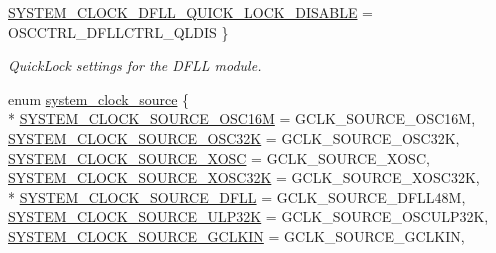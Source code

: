 \begin{DoxyCompactItemize}
\hyperlink{group__asfdoc__sam0__system__clock__group_gga56ab87696abcd4e0103d6259386017aea1d2b1b500737f7722a86e3242cf2250c}{S\+Y\+S\+T\+E\+M\+\_\+\+C\+L\+O\+C\+K\+\_\+\+D\+F\+L\+L\+\_\+\+Q\+U\+I\+C\+K\+\_\+\+L\+O\+C\+K\+\_\+\+D\+I\+S\+A\+B\+L\+E} = O\+S\+C\+C\+T\+R\+L\+\_\+\+D\+F\+L\+L\+C\+T\+R\+L\+\_\+\+Q\+L\+D\+I\+S
 \}
\begin{DoxyCompactList}\small\item\em Quick\+Lock settings for the D\+F\+L\+L module. \end{DoxyCompactList}\item 
enum \hyperlink{group__asfdoc__sam0__system__clock__group_ga86882dc960f2552722e9713da97fcc58}{system\+\_\+clock\+\_\+source} \{ \\*
\hyperlink{group__asfdoc__sam0__system__clock__group_gga86882dc960f2552722e9713da97fcc58ae024e98619acf7d4d7a96d692d981cc4}{S\+Y\+S\+T\+E\+M\+\_\+\+C\+L\+O\+C\+K\+\_\+\+S\+O\+U\+R\+C\+E\+\_\+\+O\+S\+C16\+M} = G\+C\+L\+K\+\_\+\+S\+O\+U\+R\+C\+E\+\_\+\+O\+S\+C16\+M, 
\hyperlink{group__asfdoc__sam0__system__clock__group_gga86882dc960f2552722e9713da97fcc58a558e3f5af5f17dad6386eaad5bfc5ea7}{S\+Y\+S\+T\+E\+M\+\_\+\+C\+L\+O\+C\+K\+\_\+\+S\+O\+U\+R\+C\+E\+\_\+\+O\+S\+C32\+K} = G\+C\+L\+K\+\_\+\+S\+O\+U\+R\+C\+E\+\_\+\+O\+S\+C32\+K, 
\hyperlink{group__asfdoc__sam0__system__clock__group_gga86882dc960f2552722e9713da97fcc58a3838555d84536119b61101649678ef4a}{S\+Y\+S\+T\+E\+M\+\_\+\+C\+L\+O\+C\+K\+\_\+\+S\+O\+U\+R\+C\+E\+\_\+\+X\+O\+S\+C} = G\+C\+L\+K\+\_\+\+S\+O\+U\+R\+C\+E\+\_\+\+X\+O\+S\+C, 
\hyperlink{group__asfdoc__sam0__system__clock__group_gga86882dc960f2552722e9713da97fcc58a122233d164de1b1847acc526e1d83360}{S\+Y\+S\+T\+E\+M\+\_\+\+C\+L\+O\+C\+K\+\_\+\+S\+O\+U\+R\+C\+E\+\_\+\+X\+O\+S\+C32\+K} = G\+C\+L\+K\+\_\+\+S\+O\+U\+R\+C\+E\+\_\+\+X\+O\+S\+C32\+K, 
\\*
\hyperlink{group__asfdoc__sam0__system__clock__group_gga86882dc960f2552722e9713da97fcc58a6115cfc6953d6fceaaa84fbfcfd51212}{S\+Y\+S\+T\+E\+M\+\_\+\+C\+L\+O\+C\+K\+\_\+\+S\+O\+U\+R\+C\+E\+\_\+\+D\+F\+L\+L} = G\+C\+L\+K\+\_\+\+S\+O\+U\+R\+C\+E\+\_\+\+D\+F\+L\+L48\+M, 
\hyperlink{group__asfdoc__sam0__system__clock__group_gga86882dc960f2552722e9713da97fcc58af5975ab246b9e6750998d0fcb313c288}{S\+Y\+S\+T\+E\+M\+\_\+\+C\+L\+O\+C\+K\+\_\+\+S\+O\+U\+R\+C\+E\+\_\+\+U\+L\+P32\+K} = G\+C\+L\+K\+\_\+\+S\+O\+U\+R\+C\+E\+\_\+\+O\+S\+C\+U\+L\+P32\+K, 
\hyperlink{group__asfdoc__sam0__system__clock__group_gga86882dc960f2552722e9713da97fcc58aba00702aad6c05fe8c0a864dedf6dbea}{S\+Y\+S\+T\+E\+M\+\_\+\+C\+L\+O\+C\+K\+\_\+\+S\+O\+U\+R\+C\+E\+\_\+\+G\+C\+L\+K\+I\+N} = G\+C\+L\+K\+\_\+\+S\+O\+U\+R\+C\+E\+\_\+\+G\+C\+L\+K\+I\+N, 

\end{DoxyCompactItemize}
